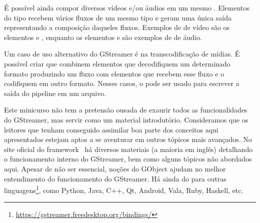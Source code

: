 É possível ainda compor diversos vídeos e/ou áudios em um mesmo .
Elementos do tipo  recebem vários fluxos de um mesmo tipo e geram uma
única saída representando a composição daqueles fluxos. Exemplos de 
de vídeo são os elementos  e , enquanto os elementos
 e  são exemplos de  de áudio. 

Um caso de uso alternativo do GStreamer é na transcodificação de mídias. 
É possível criar  que combinem elementos que decodifiquem
um determinado formato produzindo um fluxo  com elementos que recebem
esse fluxo  e o codifiquem em outro formato. Nesses casos, o 
 pode ser usado para escrever a saída do pipeline em um arquivo.

Este minicurso não tem a pretensão ousada de exaurir todos as funcionalidades
do GStreamer, mas servir como um material introdutório. Consideramos que os 
leitores que tenham conseguido assimilar boa parte dos conceitos aqui
apresentados estejam aptos a se aventurar em outros tópicos mais avançados.
No site oficial do framework~\cite{gstreamer} há diversos materiais (a maioria
em inglês) detalhando o funcionamento interno do GStreamer, bem como alguns
tópicos não abordados aqui. Apesar de não ser essencial, noções do 
 GObject ajudam no melhor entendimento do 
funcionamento do GStreamer. Há ainda  do  para
outras linguagens\footnote{\url{https://gstreamer.freedesktop.org/bindings/}},
como Python, Java, C++, Qt, Android, Vala, Ruby, Haskell, etc.

